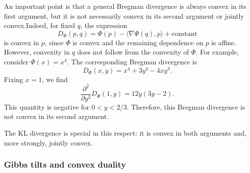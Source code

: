 \documentclass[12pt,a4paper,oneside]{book}
\begin{document}
\begin{solution}
\begin{Notice}
An important point is that a general Bregman divergence is always convex in its first argument, but it is not necessarily
convex in its second argument or jointly convex.Indeed, for fixed $q$, the expression
\begin{equation*}
    D_\Phi(p,q) = \Phi(p)-\langle\nabla\Phi(q),p\rangle + \text{constant}
\end{equation*}
is convex in $p$, since $\Phi$ is convex and the remaining dependence on $p$ is affine. However, convexity in $q$ does not
follow from the convexity of $\Phi$. For example, consider $\Phi(x)=x^4$. The corresponding Bregman divergence is
\begin{equation*}
    D_\Phi(x,y) = x^4+3y^4-4xy^3.
\end{equation*}
Fixing $x=1$, we find
\begin{equation*}
    \frac{\partial^2}{\partial y^2}D_\Phi(1,y) = 12y(3y-2).
\end{equation*}
This quantity is negative for $0<y<2/3$. Therefore, this Bregman divergence is not convex in its second argument.

The KL divergence is special in this respect: it is convex in both arguments and, more strongly, jointly convex.
\end{Notice}
\end{solution}


\subsubsection{Gibbs tilts and convex duality}
\label{src:p11q5}
\end{document}
